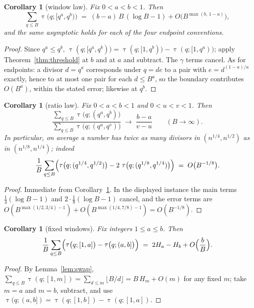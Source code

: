 \documentclass[11pt]{amsart}
\newtheorem{corollary}[theorem]{Corollary}
\theoremstyle{remark}
\newcommand{\eul}{\gamma}
\DeclareMathOperator{\divc}{\tau}
\begin{document}
\begin{corollary}[window law]\label{cor:window}
Fix $0<a<b<1$.  Then
\[
\sum_{q\le B}\divc\bigl(q;[q^{a},q^{b})\bigr)
\;=\;(b-a)\,B\,(\log B-1)+O\bigl(B^{\max(b,\,1-a)}\bigr),
\]
and the same asymptotic holds for each of the four endpoint
conventions.
\end{corollary}

\begin{proof}
Since $q^{a}\le q^{b}$,
$\divc(q;[q^{a},q^{b}))=\divc(q;[1,q^{b}))-\divc(q;[1,q^{a}))$;
apply Theorem~\ref{thm:threshold} at $b$ and at $a$ and subtract.  The
$\eul$ terms cancel.  As for endpoints: a divisor $d=q^{a}$ corresponds
under $q=de$ to a pair with $e=d^{(1-a)/a}$ exactly, hence to at most
one pair for each $d\le B^{a}$, so the boundary contributes $O(B^{a})$,
within the stated error; likewise at $q^{b}$.
\end{proof}

\begin{corollary}[ratio law]\label{cor:ratio}
Fix $0<a<b<1$ and $0<u<v<1$.  Then
\[
\frac{\displaystyle\sum_{q\le B}\divc\bigl(q;(q^{a},q^{b})\bigr)}
     {\displaystyle\sum_{q\le B}\divc\bigl(q;(q^{u},q^{v})\bigr)}
\;\longrightarrow\;\frac{b-a}{v-u}
\qquad(B\to\infty).
\]
In particular, on average a number has twice as many divisors in
$(n^{1/4},n^{1/2})$ as in $(n^{1/8},n^{1/4})$; indeed
\[
\frac1B\sum_{q\le B}
\Bigl(\divc\bigl(q;(q^{1/4},q^{1/2})\bigr)
-2\,\divc\bigl(q;(q^{1/8},q^{1/4})\bigr)\Bigr)
\;=\;O\bigl(B^{-1/8}\bigr).
\]
\end{corollary}

\begin{proof}
Immediate from Corollary~\ref{cor:window}.  In the displayed instance
the main terms $\tfrac14(\log B-1)$ and $2\cdot\tfrac18(\log B-1)$
cancel, and the error terms are
$O(B^{\max(1/2,3/4)-1})+O(B^{\max(1/4,7/8)-1})=O(B^{-1/8})$.
\end{proof}

\begin{corollary}[fixed windows]\label{cor:fixed}
Fix integers $1\le a\le b$.  Then
\[
\frac1B\sum_{q\le B}
\Bigl(\divc\bigl(q;[1,a]\bigr)-\divc\bigl(q;(a,b]\bigr)\Bigr)
\;=\;2H_{a}-H_{b}+O\Bigl(\frac{b}{B}\Bigr).
\]
\end{corollary}

\begin{proof}
By Lemma~\ref{lem:swap},
$\sum_{q\le B}\divc(q;[1,m])=\sum_{d\le m}\lfloor B/d\rfloor
=B\,H_{m}+O(m)$ for any fixed $m$; take $m=a$ and $m=b$, subtract, and
use $\divc(q;(a,b])=\divc(q;[1,b])-\divc(q;[1,a])$.
\end{proof}
\end{document}
